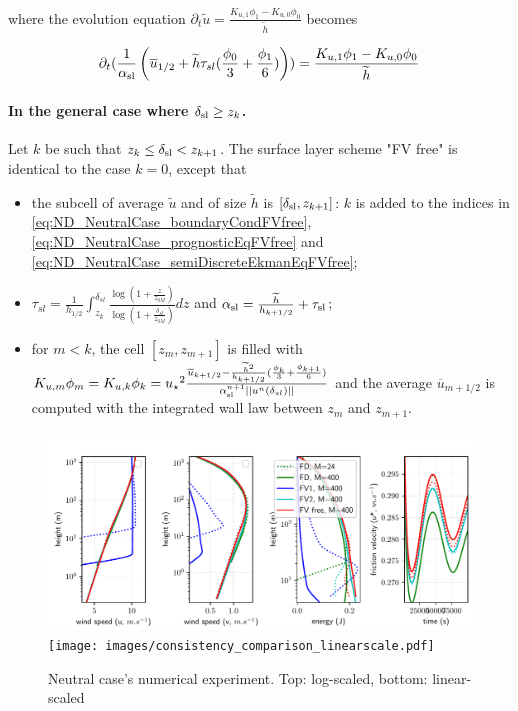 where the evolution equation 
$ \partial_t \widetilde{u}
= \frac{K_{u, 1}\phi_1 - K_{u,0} \phi_0}{\widetilde{h}}$ becomes

\begin{equation}
	\label{eq:ND_NeutralCase_semiDiscreteEkmanEqFVfree}
	\partial_t (\frac{1}{\alpha_{\rm sl}}\left(\overline{u}_{1/2} + \widetilde{h}\tau_{sl}(\frac{\phi_0}{3} + \frac{\phi_1}{6})\right))
= \frac{K_{u, 1}\phi_1 - K_{u,0} \phi_0}{\widetilde{h}}
\end{equation}
\paragraph{In the general case where $\delta_{\rm sl} \geq z_k$.}
Let $k$ be such that $z_k \leq \delta_{\rm sl} < z_{k+1}$.
The surface layer scheme "FV free" is identical to the case $k=0$, except that
\begin{itemize}
	\item the subcell of average $\widetilde{u}$ and of size
		$\widetilde{h}$ is $[\delta_{\rm sl}, z_{k+1}]$:
		$k$ is added to the indices in 
		\eqref{eq:ND_NeutralCase_boundaryCondFVfree},
		\eqref{eq:ND_NeutralCase_prognosticEqFVfree} and
		\eqref{eq:ND_NeutralCase_semiDiscreteEkmanEqFVfree};
	\item $\tau_{sl} = \frac{1}{{h_{1/2}}}\int_{z_k}^{\delta_{sl}} \frac{\log(1+\frac{z}{z_{0M}})}{\log(1+\frac{\delta_{sl}}{z_{0M}})} dz$ and $\alpha_{\rm sl} = \frac{\widetilde{h}}{h_{k+1/2}} + \tau_{\rm sl}$;
	\item for $m < k$, the cell $[z_m, z_{m+1}]$ is filled with
		$K_{u,m} \phi_m = K_{u,k}\phi_k =
	{u_\star}^2 \frac{\overline{u}_{k+1/2} -
		\frac{\widetilde{h}^2}{h_{k+1/2}}
		(\frac{\phi_k}{3} + \frac{\phi_{k+1}}{6})}
		{\alpha_{\rm sl}^{n+1}||u^n(\delta_{sl})||}$
		and the average $\overline{u}_{m+1/2}$
		is computed with the integrated wall law
		between $z_m$ and $z_{m+1}$.
	
\end{itemize}
\begin{figure}
	\centering
	\includegraphics[scale=0.55]{images/consistency_comparison.pdf}
	\texttt{[image: images/consistency\_comparison\_linearscale.pdf]}
	\caption{Neutral case's numerical experiment. Top: log-scaled, bottom: linear-scaled}
	\label{fig:ND_NeutralCase_NumericalExp}
\end{figure}
